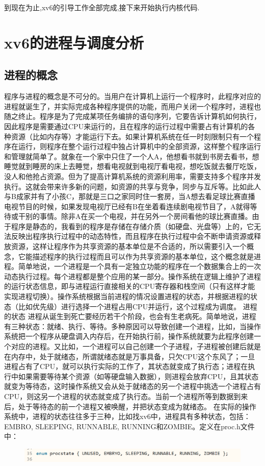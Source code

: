 \documentclass[a4paper,12pt]{report}
\begin{document}
到现在为止,xv6的引导工作全部完成,接下来开始执行内核代码.
\section{xv6的进程与调度分析}






\subsection{进程的概念}
  程序与进程的概念是不可分的。当用户在计算机上运行一个程序时，此程序对应的进程就诞生了，并实际完成各种程序提供的功能，而用户关闭一个程序时，进程也随之终止。程序是为了完成某项任务编排的语句序列，它要告诉计算机如何执行，因此程序是需要通过CPU来运行的，且在程序的运行过程中需要占有计算机的各种资源（比如内存等）才能运行下去。如果计算机系统在任一时刻限制只有一个程序在运行，则程序在整个运行过程中独占计算机中的全部资源，这样整个程序运行和管理就简单了。就象在一个家中只住了一个人A，他想看书就到书房去看书，想睡觉就到睡房的床上去睡觉，想看电视就到电视厅看电视，想吃饭就去餐厅吃饭，没人和他抢占资源。但为了提高计算机系统的资源利用率，需要支持多个程序并发执行。这就会带来许多新的问题，如资源的共享与竞争，同步与互斥等。比如此人与B成家并有了小孩C，那就是三口之家同时住一套房，当A想去看足球比赛直播电视节目的时候，如果发现电视厅已经有B在坐着看连续剧电视节目了，A就得等待或干别的事情。除非A在买一个电视，并在另外一个房间看他的球比赛直播。由于程序是静态的，我看到的程序是存储在存储介质（如硬盘、光盘等）上的，它无法反映出程序执行过程中的动态特性，而且程序在执行过程中会不断申请资源或释放资源，这样让程序作为共享资源的基本单位是不合适的，所以需要引入一个概念，它能描述程序的执行过程而且可以作为共享资源的基本单位，这个概念就是进程。简单地说，一个进程是一个具有一定独立功能的程序在一个数据集合上的一次动态执行过程。每个进程都是整个应用的某一部分。操作系统在逻辑上维护了进程的运行状态信息，即与进程运行直接相关的CPU寄存器和栈空间（只有这样才能实现进程切换）。操作系统根据当前进程的情况设置进程的状态，并根据进程的状态（比如优先级）进行选择一个进程占用CPU并运行，这个过程成为调度。
进程的状态
进程从诞生到死亡要经历若干个阶段，也会有生老病死。简单地说，进程有三种状态：就绪、执行、等待。多种原因可以导致创建一个进程，比如，当操作系统把一个程序从硬盘调入内存后，在开始执行前，操作系统就要为此程序创建一个对应的进程。又比如，一个进程可以自己创建一个子进程，子进程被创建后就是在内存中，处于就绪态，所谓就绪态就是万事具备，只欠CPU这个东风了；一旦进程占有了CPU，就可以执行实际的工作了，其状态就变成了执行态；进程在执行中如果需要等待某个资源（如等硬盘输入数据），则进程会放弃CPU，且其状态就变为等待态，这时操作系统又会从处于就绪态的另一个进程中挑选一个进程占有CPU，则这另一个进程的状态就变成了执行态。当前一个进程所等到数据到来后，处于等待态的前一个进程又被唤醒，并把状态变成为就绪态。
在实际的操作系统中，进程的状态往往多于三种，比如找xv6中，进程具有多种状态，包括：EMBRO, SLEEPING, RUNNABLE, RUNNING和ZOMBIE。定义在proc.h文件中：
\begin{figure}[H]
	\centering
	\includegraphics [width=1.0\textwidth]{figure//imageproc.png}
\end{figure}
\end{document}
